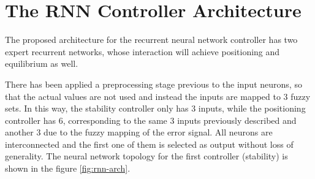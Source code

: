\documentclass{sig-alternate}
\begin{document}




\section{The RNN Controller Architecture}
\label{sec:rnncontroller}
The proposed architecture for the recurrent neural network controller
has two expert recurrent networks, whose interaction will achieve
positioning and equilibrium as well.

There has been applied a preprocessing stage previous to the input
neurons, so that the actual values are not used and instead the inputs
are mapped to 3 fuzzy sets. In this way, the stability controller only
has 3 inputs, while the positioning controller has 6, corresponding to
the same 3 inputs previously described and another 3 due to the fuzzy
mapping of the error signal. All neurons are interconnected and the
first one of them is selected as output without loss of
generality. The neural network topology for the first controller
(stability) is shown in the figure \ref{fig:rnn-arch}.
\end{document}
